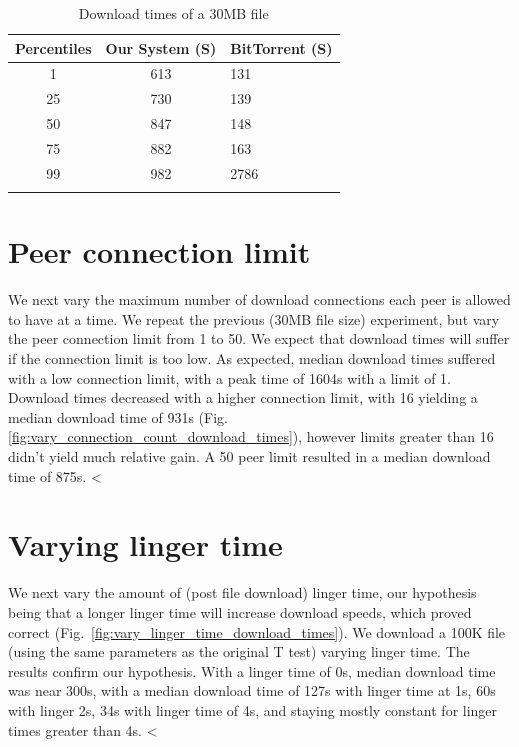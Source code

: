 \begin{table}
  \caption{Download times of a 30MB file}
\begin{tabular}{ c c l }
  Percentiles & Our System (S) & BitTorrent (S) \\
  \hline
  1 & 613 & 131 \\
  25 & 730 & 139 \\
  50 & 847 & 148 \\
  75 & 882 & 163 \\
  99 & 982 & 2786 \\
  \label{fig:yanc_vs_bt}
\end{tabular}
\end{table}
  
\section{Peer connection limit} 

We next vary the maximum number of download connections each peer is allowed to have at a time. We 
repeat the previous (30MB file size) experiment, but vary the peer connection limit from 1 to 50. 
We expect that download times will suffer if the connection limit is too low. As expected, median 
download times suffered with a low connection limit, with a peak time of 1604s with a limit of 1. Download 
times decreased with a higher connection limit, with 16 yielding a median download time of 931s 
(Fig. \ref{fig:vary_connection_count_download_times}), however limits greater than 16 didn't 
yield much relative gain. A 50 peer limit resulted in a median download time of 875s. 
<%

\section{Varying linger time}

We next vary the amount of (post file download) linger time, our hypothesis being that a longer linger 
time will increase download speeds, which proved correct (Fig.~\ref{fig:vary_linger_time_download_times}). 
We download a 100K file (using the same parameters as the original T test) varying linger time. The 
results confirm our hypothesis. With a linger time of 0s, median download time was near 300s, with 
a median download time of 127s with linger time at 1s, 60s with linger 2s, 34s with linger time of 4s, 
and staying mostly constant for linger times greater than 4s. 
<%
